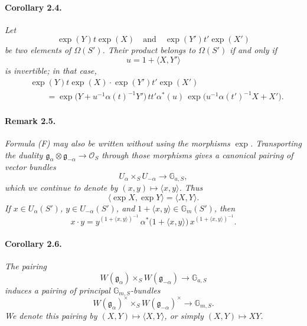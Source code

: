 
\paragraph{\textbf{Corollary 2.4.}}
\emph{Let}
\[
  \exp(Y)t\exp(X)
  \quad\text{and}\quad
  \exp(Y')t'\exp(X')
\]
\emph{be two elements of \(\Omega(S')\). Their product belongs to
\(\Omega(S')\) if and only if}
\[
  u=1+\langle X,Y'\rangle
\]
\emph{is invertible; in that case,}
\begin{equation}\tag{F'}
\begin{split}
  &\exp(Y)t\exp(X)\cdot\exp(Y')t'\exp(X')\\
  &\qquad
   =\exp\bigl(Y+u^{-1}\alpha(t)^{-1}Y'\bigr)\,
      tt'\alpha^\ast(u)\,
      \exp\bigl(u^{-1}\alpha(t')^{-1}X+X'\bigr).
\end{split}
\end{equation}

\paragraph{\textbf{Remark 2.5.}}
\emph{Formula \textup{(F)} may also be written
without using the morphisms \(\exp\). Transporting the duality
\(\mathfrak g_\alpha\otimes\mathfrak g_{-\alpha}\to\mathscr O_S\)
through those morphisms gives a canonical pairing of vector
bundles}
\[
  U_\alpha\times_S U_{-\alpha}\longrightarrow\mathbb G_{a,S},
\]
\emph{which we continue to denote by
\((x,y)\mapsto\langle x,y\rangle\). Thus}
\[
  \langle\exp X,\exp Y\rangle=\langle X,Y\rangle.
\]
\emph{If \(x\in U_\alpha(S')\), \(y\in U_{-\alpha}(S')\), and
\(1+\langle x,y\rangle\in\mathbb G_m(S')\), then}
\[
  x\cdot y
   =y^{(1+\langle x,y\rangle)^{-1}}\,
      \alpha^\ast\bigl(1+\langle x,y\rangle\bigr)\,
      x^{(1+\langle x,y\rangle)^{-1}}.
\]

\paragraph{\textbf{Corollary 2.6.}}
\emph{The pairing}
\[
  W(\mathfrak g_\alpha)\times_S W(\mathfrak g_{-\alpha})
    \longrightarrow\mathbb G_{a,S}
\]
\emph{induces a pairing of principal
\(\mathbb G_{m,S}\)-bundles}
\[
  W(\mathfrak g_\alpha)^\times
    \times_S W(\mathfrak g_{-\alpha})^\times
      \longrightarrow\mathbb G_{m,S}.
\]
\emph{We denote this pairing by
\((X,Y)\mapsto\langle X,Y\rangle\), or simply
\((X,Y)\mapsto XY\).}

